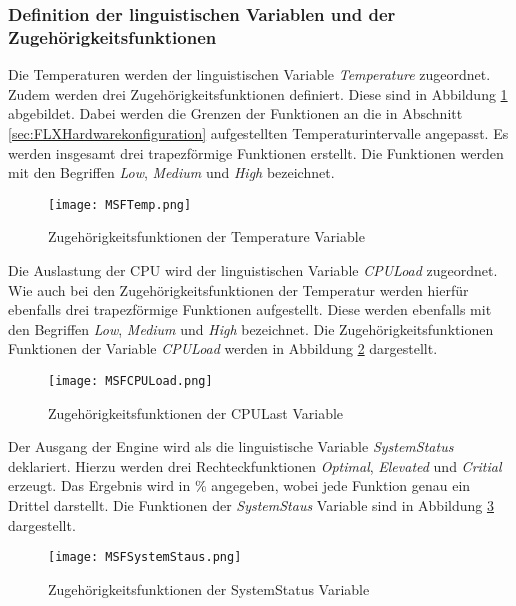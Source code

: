 \subsubsection*{Definition der linguistischen Variablen und der Zugehörigkeitsfunktionen}
Die Temperaturen werden der linguistischen Variable \textit{Temperature} zugeordnet. Zudem werden drei Zugehörigkeitsfunktionen definiert. Diese sind in Abbildung \ref{fig:MSFTemp} abgebildet. Dabei werden die Grenzen der Funktionen an die in Abschnitt \ref{sec:FLXHardwarekonfiguration} aufgestellten Temperaturintervalle angepasst. Es werden insgesamt drei trapezförmige Funktionen erstellt. Die Funktionen werden mit den Begriffen \textit{Low}, \textit{Medium} und \textit{High} bezeichnet.
\begin{center}
    \begin{figure}[h!]
        \centering
        \texttt{[image: MSFTemp.png]}
        \caption{Zugehörigkeitsfunktionen der Temperature Variable}
        \label{fig:MSFTemp}
    \end{figure}
\end{center}
\vspace{-0.5cm}
Die Auslastung der CPU wird der linguistischen Variable \textit{CPULoad} zugeordnet. Wie auch bei den Zugehörigkeitsfunktionen der Temperatur werden hierfür ebenfalls drei trapezförmige Funktionen aufgestellt. Diese werden ebenfalls mit den Begriffen \textit{Low}, \textit{Medium} und \textit{High} bezeichnet. Die Zugehörigkeitsfunktionen Funktionen der Variable \textit{CPULoad} werden in Abbildung \ref{fig:MSFCPULoad} dargestellt.
\begin{center}
    \begin{figure}[h!]
        \centering
        \texttt{[image: MSFCPULoad.png]}
        \caption{Zugehörigkeitsfunktionen der CPULast Variable}
        \label{fig:MSFCPULoad}
    \end{figure}
\end{center}
\vspace{-0.5cm}
Der Ausgang der Engine wird als die linguistische Variable \textit{SystemStatus} deklariert. Hierzu werden drei Rechteckfunktionen \textit{Optimal}, \textit{Elevated} und \textit{Critial} erzeugt. Das Ergebnis wird in \% angegeben, wobei jede Funktion genau ein Drittel darstellt. Die Funktionen der \textit{SystemStaus} Variable sind in Abbildung \ref{fig:MSFSystemStaus} dargestellt.
\begin{center}
    \begin{figure}[h!]
        \centering
        \texttt{[image: MSFSystemStaus.png]}
        \caption{Zugehörigkeitsfunktionen der SystemStatus Variable}
        \label{fig:MSFSystemStaus}
    \end{figure}
\end{center}
\vspace{-0.5cm}  

